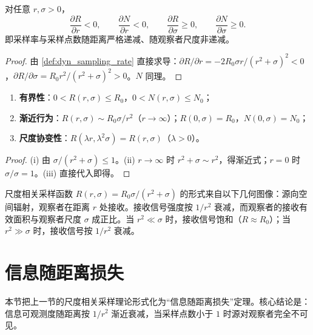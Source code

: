 \begin{proposition}[采样函数的单调性]\label{prop:dyn_sampling_monotonicity}
对任意 $r,\sigma>0$，
\[
\frac{\partial R}{\partial r}<0,\qquad
\frac{\partial N}{\partial r}<0,\qquad
\frac{\partial R}{\partial\sigma}\ge 0,\qquad
\frac{\partial N}{\partial\sigma}\ge 0.
\]
即采样率与采样点数随距离严格递减、随观察者尺度非递减。
\end{proposition}

\begin{proof}
由 \cref{def:dyn_sampling_rate} 直接求导：$\partial R/\partial r=-2R_0\sigma r/(r^2+\sigma)^2<0$，$\partial R/\partial\sigma=R_0r^2/(r^2+\sigma)^2>0$。$N$ 同理。
\end{proof}

\begin{property}[采样函数的基本性质]\label{prop:dyn_sampling_properties}
\begin{enumerate}[label=(\roman*)]
    \item \textbf{有界性}：$0<R(r,\sigma)\le R_0$，$0<N(r,\sigma)\le N_0$；
    \item \textbf{渐近行为}：$R(r,\sigma)\sim R_0\sigma/r^2$（$r\to\infty$）；$R(0,\sigma)=R_0$，$N(0,\sigma)=N_0$；
    \item \textbf{尺度协变性}：$R(\lambda r,\lambda^2\sigma)=R(r,\sigma)$（$\lambda>0$）。
\end{enumerate}
\end{property}

\begin{proof}
(i) 由 $\sigma/(r^2+\sigma)\le 1$。(ii) $r\to\infty$ 时 $r^2+\sigma\sim r^2$，得渐近式；$r=0$ 时 $\sigma/\sigma=1$。(iii) 直接代入即得。
\end{proof}

\begin{remark}[采样函数的物理来源]\label{rem:dyn_sampling_physical_source}
尺度相关采样函数 $R(r,\sigma)=R_0\sigma/(r^2+\sigma)$ 的形式来自以下几何图像：源向空间辐射，观察者在距离 $r$ 处接收。接收信号强度按 $1/r^2$ 衰减，而观察者的接收有效面积与观察者尺度 $\sigma$ 成正比。当 $r^2\ll\sigma$ 时，接收信号饱和（$R\approx R_0$）；当 $r^2\gg\sigma$ 时，接收信号按 $1/r^2$ 衰减。
\end{remark}

\section{信息随距离损失}
\label{sec:dyn_information_distance}

本节把上一节的尺度相关采样理论形式化为“信息随距离损失”定理。核心结论是：信息可观测度随距离按 $1/r^2$ 渐近衰减，当采样点数小于 $1$ 时源对观察者完全不可见。

